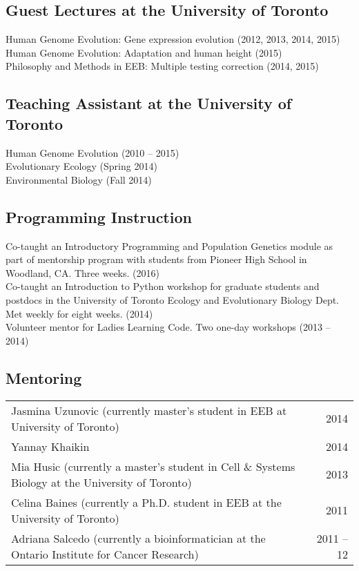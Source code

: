\documentclass[letterpaper]{article}
\begin{document}
\subsection*{Guest Lectures at the University of Toronto}
Human Genome Evolution: Gene expression evolution (2012, 2013, 2014, 2015)\\
Human Genome Evolution: Adaptation and human height (2015)\\
Philosophy and Methods in EEB: Multiple testing correction (2014, 2015)
\subsection*{Teaching Assistant at the University of Toronto}
Human Genome Evolution (2010 -- 2015) \\ 
Evolutionary Ecology (Spring 2014) \\
Environmental Biology (Fall 2014)

\subsection*{Programming Instruction}
Co-taught an Introductory Programming and Population Genetics module as part of mentorship program with students from Pioneer High School in Woodland, CA. Three weeks. (2016) \\[.5ex]
Co-taught an Introduction to Python workshop for graduate students and postdocs in the University of Toronto Ecology and Evolutionary Biology Dept. Met weekly for eight weeks. (2014) \\[.5ex]
Volunteer mentor for Ladies Learning Code. Two one-day workshops (2013 -- 2014) \\[.5ex]


\subsection*{Mentoring}
 \begin{tabular}{MN}
Jasmina Uzunovic (currently master's student in EEB at University of Toronto) & 2014 \\
Yannay Khaikin & 2014 \\
Mia Husic (currently a master's student in Cell \& Systems Biology at the University of Toronto) & 2013 \\
Celina Baines (currently a Ph.D. student in EEB at the University of Toronto) & 2011 \\
Adriana Salcedo (currently a bioinformatician at the Ontario Institute for Cancer Research) & 2011 -- 12
 \end{tabular}
\end{document}
